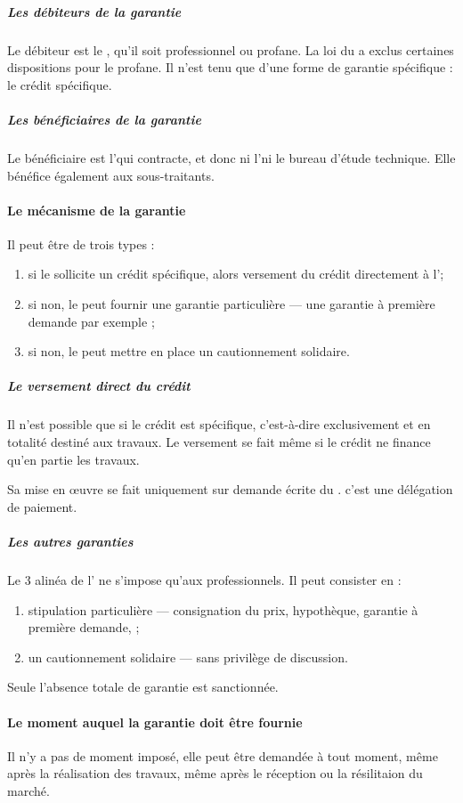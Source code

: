 					\subparagraph{Les débiteurs de la garantie} Le débiteur est le \Mo, qu'il soit professionnel ou profane. La loi du  a exclus certaines dispositions pour le \Mo profane. Il n'est tenu que d'une forme de garantie spécifique : le crédit spécifique.
					
					\subparagraph{Les bénéficiaires de la garantie} Le bénéficiaire est l'\E qui contracte, et donc ni l'\archi ni le bureau d'étude technique. Elle bénéfice également aux sous-traitants.
				
				\paragraph{Le mécanisme de la garantie}
				
					Il peut être de trois types :
					\begin{enumerate}
						\item si le \Mo sollicite un crédit spécifique, alors versement du crédit directement à l'\E ;
						\item si non, le \Mo peut fournir une garantie particulière --- une garantie à première demande par exemple ;
						\item si non, le \Mo peut mettre en place un cautionnement solidaire.
					\end{enumerate}
				
					\subparagraph{Le versement direct du crédit} Il n'est possible que si le crédit est spécifique, c'est-à-dire exclusivement et en totalité destiné aux travaux. Le versement se fait même si le crédit ne finance qu'en partie les travaux.
					
					Sa mise en œuvre se fait uniquement sur demande écrite du \Mo. c'est une délégation de paiement.
					
					\subparagraph{Les autres garanties}
					
					Le 3\ieme{} alinéa de l' ne s'impose qu'aux professionnels. Il peut consister en :
					\begin{enumerate}
						\item stipulation particulière --- consignation du prix, hypothèque, garantie à première demande, \etc ;
						\item un cautionnement solidaire --- sans privilège de discussion.
					\end{enumerate} 
				
					Seule l'absence totale de garantie est sanctionnée.
				
				\paragraph{Le moment auquel la garantie doit être fournie} Il n'y a pas de moment imposé, elle peut être demandée à tout moment, même après la réalisation des travaux, même après le réception ou la résilitaion du marché.
				
